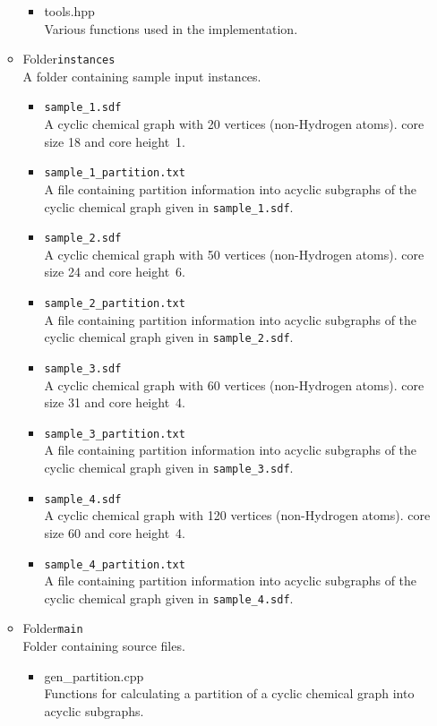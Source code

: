 \documentclass[11pt,titlepage,dvipdfmx,twoside]{article}
\begin{document}
\begin{itemize}
\begin{itemize}
\begin{itemize}
			\item{tools.hpp}\\
				Various functions used in the implementation.
		\end{itemize}
	\item Folder{\tt instances}\\
		A folder containing sample input instances.
		\begin{itemize}
			\item{\tt sample\_1.sdf}\\
			  A cyclic chemical graph with 20 vertices (non-Hydrogen atoms).
			    core size 18 and core height~1.
			\item{\tt sample\_1\_partition.txt}\\
			  A file containing partition information into acyclic subgraphs 
				of the cyclic chemical graph given in {\tt sample\_1.sdf}.
			\item{\tt sample\_2.sdf}\\
			  A cyclic chemical graph with 50 vertices (non-Hydrogen atoms).
			    core size 24 and core height~6.
			\item{\tt sample\_2\_partition.txt}\\
			  A file containing partition information into acyclic subgraphs 
				of the cyclic chemical graph given in {\tt sample\_2.sdf}.
			\item{\tt sample\_3.sdf}\\
			  A cyclic chemical graph with 60 vertices (non-Hydrogen atoms).
			    core size 31 and core height~4.
			\item{\tt sample\_3\_partition.txt}\\
			  A file containing partition information into acyclic subgraphs 
				of the cyclic chemical graph given in {\tt sample\_3.sdf}.
			\item{\tt sample\_4.sdf}\\
			  A cyclic chemical graph with 120 vertices (non-Hydrogen atoms).
			    core size 60 and core height~4.
			\item{\tt sample\_4\_partition.txt}\\
			  A file containing partition information into acyclic subgraphs 
				of the cyclic chemical graph given in {\tt sample\_4.sdf}.
		\end{itemize}
		
	\item Folder{\tt main}\\
		Folder containing source files.
		\begin{itemize}
			\item{gen\_partition.cpp}\\
				Functions for calculating a partition of a cyclic chemical graph into
				acyclic subgraphs.
				

\end{itemize}
\end{itemize}
\end{itemize}
\end{document}

